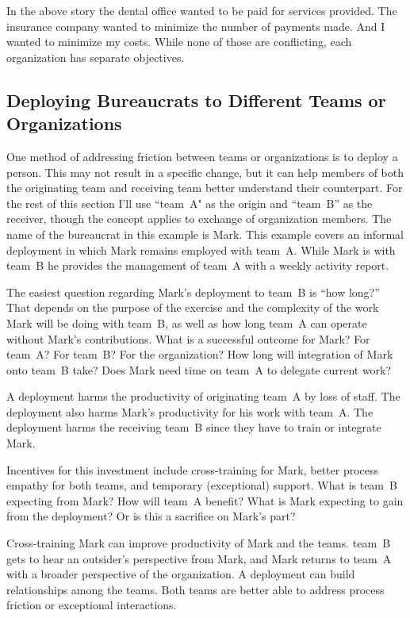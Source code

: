 In the above story the dental office wanted to be paid for services provided. The insurance company wanted to minimize the number of payments made. And I wanted to minimize my costs. While none of those are conflicting, each organization has separate objectives.

\subsection*{Deploying Bureaucrats to Different Teams or Organizations\label{sec:prisoner-exchange}}

One method of addressing friction between teams or organizations is to deploy a person. This may not result in a specific change, but it can help members of both the originating team and receiving team better understand their counterpart. For the rest of this section I'll use ``team~A" as the origin and ``team~B'' as the receiver, though the concept applies to exchange of organization members. The name of the bureaucrat in this example is Mark. This example covers an informal deployment in which Mark remains employed with team~A. While Mark is with team~B he provides the management of team~A with a weekly activity report. 

The easiest question regarding Mark's deployment to team~B is ``how long?'' That depends on the purpose of the exercise and the complexity of the work Mark will be doing with team~B, as well as how long team~A can operate without Mark's contributions. What is a successful outcome for Mark? For team~A? For team~B? For the organization? How long will integration of Mark onto team~B take? Does Mark need time on team~A to delegate current work?

A deployment harms the productivity of originating team~A by loss of staff. The deployment also harms Mark's productivity for his work with team~A. The deployment harms the receiving team~B since they have to train or integrate Mark. 

Incentives for this investment include cross-training for Mark, better process empathy for both teams, and temporary (exceptional) support. What is team~B expecting from Mark? How will team~A benefit? What is Mark expecting to gain from the deployment? Or is this a sacrifice on Mark's part? 

Cross-training Mark can improve productivity of Mark and the teams. 
team~B gets to hear an outsider's perspective from Mark, and Mark returns to team~A with a broader perspective of the organization.
A deployment can build relationships among the teams. Both teams are better able to address process friction or exceptional interactions. 


